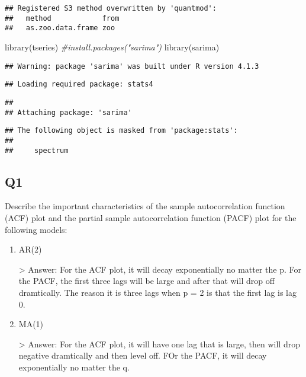 \documentclass[
]{article}
\newenvironment{Shaded}{\begin{snugshade}}{\end{snugshade}}
\newcommand{\CommentTok}[1]{\textcolor[rgb]{0.56,0.35,0.01}{\textit{#1}}}
\newcommand{\FunctionTok}[1]{\textcolor[rgb]{0.00,0.00,0.00}{#1}}
\newcommand{\NormalTok}[1]{#1}
\begin{document}
\begin{verbatim}
## Registered S3 method overwritten by 'quantmod':
##   method            from
##   as.zoo.data.frame zoo
\end{verbatim}

\begin{Shaded}
\begin{Highlighting}[]
\FunctionTok{library}\NormalTok{(tseries)}
\CommentTok{\#install.packages("sarima")}
\FunctionTok{library}\NormalTok{(sarima)}
\end{Highlighting}
\end{Shaded}

\begin{verbatim}
## Warning: package 'sarima' was built under R version 4.1.3
\end{verbatim}

\begin{verbatim}
## Loading required package: stats4
\end{verbatim}

\begin{verbatim}
## 
## Attaching package: 'sarima'
\end{verbatim}

\begin{verbatim}
## The following object is masked from 'package:stats':
## 
##     spectrum
\end{verbatim}

\hypertarget{q1}{%
\subsection{Q1}\label{q1}}

Describe the important characteristics of the sample autocorrelation
function (ACF) plot and the partial sample autocorrelation function
(PACF) plot for the following models:

\begin{enumerate}[label=(\alph*)]

\item AR(2)

> Answer: For the ACF plot, it will decay exponentially no matter the p. For the PACF, the first three lags will be large and after that will drop off dramtically. The reason it is three lags when p = 2 is that the first lag is lag 0.

\item MA(1)

> Answer: For the ACF plot, it will have one lag that is large, then will drop negative dramtically and then level off. FOr the PACF, it will decay exponentially no matter the q.

\end{enumerate}
\end{document}
